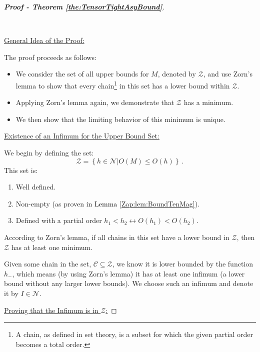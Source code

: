 \documentclass{article} %
\begin{document}
\begin{proof}[\textbf{Proof - Theorem \ref{the:TensorTightAsyBound}}]
\label{pro:TensorTightAsyBound}

\

\underline{General Idea of the Proof:}

The proof proceeds as follows:
\begin{itemize}
\item 
We consider the set of all upper bounds for \(M\), denoted by \(\mathcal{Z}\), and use Zorn's lemma to show that every chain\footnote{A chain, as defined in set theory, is a subset for which the given partial order becomes a total order.} in this set has a lower bound within \(\mathcal{Z}\).
\item
Applying Zorn's lemma again, we demonstrate that \(\mathcal{Z}\) has a minimum.
\item
We then show that the limiting behavior of this minimum is unique.
\end{itemize}

\underline{Existence of an Infimum for the Upper Bound Set:}
    
We begin by defining the set:
\begin{equation}
\mathcal{Z}=\left\{ h \in \mathcal{N} \left| O\left(M\right) \leq O\left(h\right) \right.\right\} \ .
\end{equation}
This set is:
\begin{enumerate}
    \item 
    Well defined.
    \item
    Non-empty (as proven in \textcolor{black}{Lemma} \ref{Zap:lem:BoundTenMag}).
    \item
    Defined with a partial order \(h_{1} < h_{2} \leftrightarrow O\left(h_{1}\right) < O\left(h_{2}\right)\).
\end{enumerate}
According to Zorn's lemma, if all chains in this set have a lower bound in \(\mathcal{Z}\), then \(\mathcal{Z}\) has at least one minimum.

Given some chain in the set, \(\mathcal{C} \subseteq \mathcal{Z}\), we know it is lower bounded by the function \(h_-\), which means (by using Zorn's lemma) it has at least one infimum (a lower bound without any larger lower bounds). We choose such an infimum and denote it by \(I \in \mathcal{N}\).

\underline{Proving that the Infimum is in \(\mathcal{Z}\):}


\end{proof}
\end{document}
